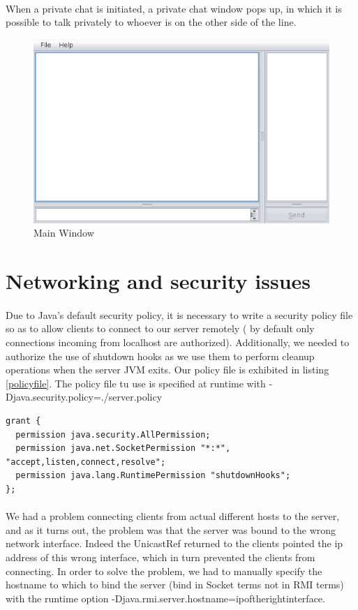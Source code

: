 \documentclass[times, 8pt,twocolumn]{article}
\begin{document}
\paragraph{} When a private chat is initiated, a private chat window pops up, in which it is possible to talk privately to whoever is on the other side of the line.
\begin{figure} [H]
    \centering
    \includegraphics[scale=0.28]{img/mainscreen.png}
    \caption{Main Window} 
    \label{fig:papinho1}
\end{figure}
\section{Networking and security issues}
\paragraph{} Due to Java's default security policy, it is necessary to write a security policy file so as to allow clients to connect to our server remotely ( by default only connections incoming from localhost are authorized). Additionally, we needed to authorize the use of shutdown hooks as we use them to perform cleanup operations when the server JVM exits. Our policy file is exhibited in listing \ref{policyfile}. The policy file tu use is specified at runtime with -Djava.security.policy=./server.policy

\begin{lstlisting}[caption={Policy file},label=policyfile]
grant {
  permission java.security.AllPermission;
  permission java.net.SocketPermission "*:*", "accept,listen,connect,resolve";
  permission java.lang.RuntimePermission "shutdownHooks";
};
\end{lstlisting}

\paragraph{} We had a problem connecting clients from actual different hosts to the server, and as it turns out, the problem was that the server was bound to the wrong network interface. Indeed the UnicastRef returned to the clients pointed the ip address of this wrong interface, which in turn prevented the clients from connecting. In order to solve the problem, we had to manually specify the hostname to which to bind the server (bind in Socket terms not in RMI terms) with the runtime option -Djava.rmi.server.hostname=ipoftherightinterface.
\end{document}
